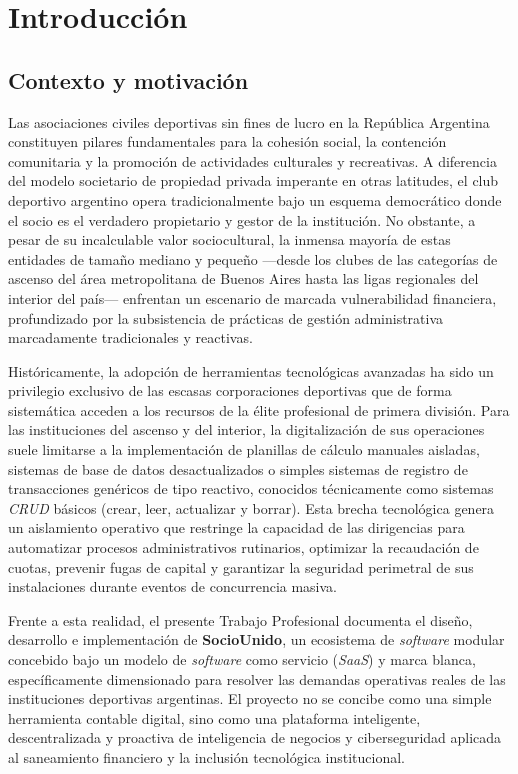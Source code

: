 \section{Introducción}

\subsection{Contexto y motivación}

Las asociaciones civiles deportivas sin fines de lucro en la República Argentina constituyen pilares fundamentales para la cohesión social, la contención comunitaria y la promoción de actividades culturales y recreativas. A diferencia del modelo societario de propiedad privada imperante en otras latitudes, el club deportivo argentino opera tradicionalmente bajo un esquema democrático donde el socio es el verdadero propietario y gestor de la institución. No obstante, a pesar de su incalculable valor sociocultural, la inmensa mayoría de estas entidades de tamaño mediano y pequeño ---desde los clubes de las categorías de ascenso del área metropolitana de Buenos Aires hasta las ligas regionales del interior del país--- enfrentan un escenario de marcada vulnerabilidad financiera, profundizado por la subsistencia de prácticas de gestión administrativa marcadamente tradicionales y reactivas.

Históricamente, la adopción de herramientas tecnológicas avanzadas ha sido un privilegio exclusivo de las escasas corporaciones deportivas que de forma sistemática acceden a los recursos de la élite profesional de primera división. Para las instituciones del ascenso y del interior, la digitalización de sus operaciones suele limitarse a la implementación de planillas de cálculo manuales aisladas, sistemas de base de datos desactualizados o simples sistemas de registro de transacciones genéricos de tipo reactivo, conocidos técnicamente como sistemas \textit{CRUD} básicos (crear, leer, actualizar y borrar). Esta brecha tecnológica genera un aislamiento operativo que restringe la capacidad de las dirigencias para automatizar procesos administrativos rutinarios, optimizar la recaudación de cuotas, prevenir fugas de capital y garantizar la seguridad perimetral de sus instalaciones durante eventos de concurrencia masiva.

Frente a esta realidad, el presente Trabajo Profesional documenta el diseño, desarrollo e implementación de \textbf{SocioUnido}, un ecosistema de \textit{software} modular concebido bajo un modelo de \textit{software} como servicio (\textit{SaaS}) y marca blanca, específicamente dimensionado para resolver las demandas operativas reales de las instituciones deportivas argentinas. El proyecto no se concibe como una simple herramienta contable digital, sino como una plataforma inteligente, descentralizada y proactiva de inteligencia de negocios y ciberseguridad aplicada al saneamiento financiero y la inclusión tecnológica institucional.

